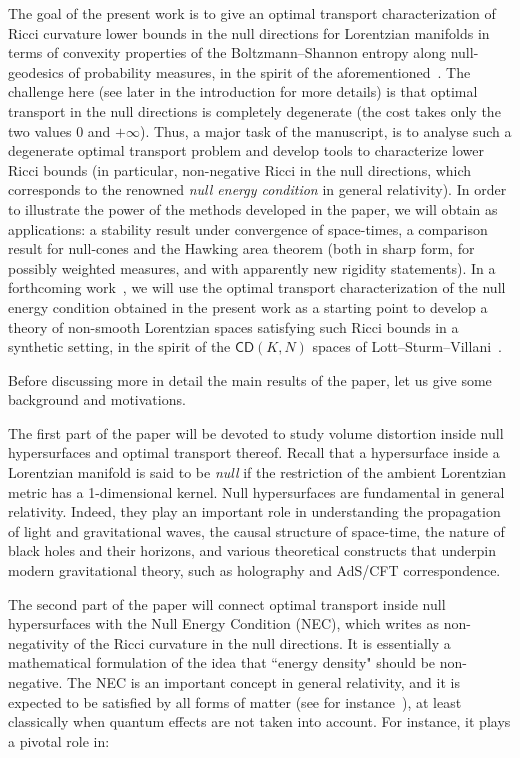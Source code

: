 \documentclass[12pt,a4paper]{amsart}
\theoremstyle{plain}
\theoremstyle{definition}
\numberwithin{equation}{section}
\begin{document}
The goal of the present work is to give an optimal transport characterization of Ricci curvature lower bounds in the null directions for Lorentzian manifolds in terms of convexity properties of the Boltzmann--Shannon entropy along null-geodesics of probability measures, in the spirit  of the aforementioned~\cite{McCannThesis, OttoVillani,CEMS, vRS}. The challenge here (see later in the introduction for more details) is that optimal transport in the null directions is completely degenerate (the cost takes only the two values $0$ and $+\infty$). Thus, a major task of the manuscript, is to analyse such a degenerate optimal transport problem and develop tools to characterize lower Ricci bounds (in particular,  non-negative Ricci in the null directions, which corresponds to the renowned  \emph{null energy condition} in general relativity). In order to illustrate the power of the methods developed in the paper, we will obtain as applications: a stability result under convergence of space-times, a comparison result for null-cones and the Hawking area theorem (both in sharp form, for possibly weighted measures, and with apparently new rigidity statements). 
In a forthcoming work~\cite{CMM24b}, we will use the optimal transport characterization of the null energy condition obtained in the present work as a starting point to develop a theory of non-smooth Lorentzian spaces satisfying such Ricci bounds in a synthetic setting, in the spirit of the ${\mathsf{CD}}(K,N)$ spaces of Lott--Sturm--Villani~\cite{sturm:I, sturm:II, lottvillani}.

Before discussing more in detail the main results of the paper, let us give some background and motivations.

The first part of the paper will be devoted to study volume distortion inside null hypersurfaces and optimal transport thereof. Recall that a hypersurface inside a Lorentzian manifold is said to be \emph{null} if the restriction of the ambient Lorentzian metric has a 1-dimensional kernel. Null hypersurfaces are fundamental in general relativity. Indeed, they play an important role in  understanding the propagation of light and gravitational waves, the causal structure of space-time, the nature of black holes and their horizons, and various theoretical constructs that underpin modern gravitational theory, such as holography and AdS/CFT correspondence. 

The second part of the paper will connect optimal transport inside null hypersurfaces with the Null Energy Condition (NEC), which writes as non-negativity of the Ricci curvature in the null directions. It is essentially a mathematical formulation of the idea that  ``energy density" should be non-negative.  The NEC is an important concept in general relativity, and it is expected to be satisfied by all forms of matter (see for instance~\cite[Ch.~4.6]{Carroll}), at least classically when quantum effects are not taken into account. For instance, it plays a pivotal role in:
\end{document}
